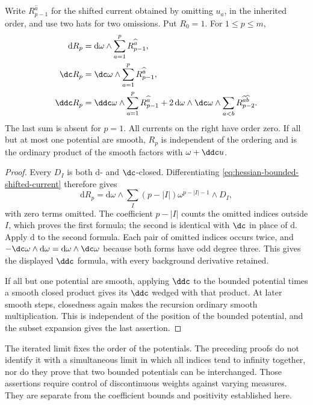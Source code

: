 \begin{proposition}\label{hessian:bounded-current-torsion}
Write $R_{p-1}^{\widehat a}$ for the shifted current obtained by
omitting $u_a$, in the inherited order, and use two hats for two
omissions. Put $R_0=1$. For $1\leq p\leq m$,
\[
 \begin{aligned}
 \mathrm dR_p&=\mathrm d\omega\wedge
                         \sum_{a=1}^pR_{p-1}^{\widehat a},\\
 \dc R_p&=\dc\omega\wedge
                         \sum_{a=1}^pR_{p-1}^{\widehat a},\\
 \ddc R_p&=\ddc\omega\wedge
                         \sum_{a=1}^pR_{p-1}^{\widehat a}
       +2\,\mathrm d\omega\wedge\dc\omega\wedge
                         \sum_{a<b}R_{p-2}^{\widehat a\widehat b}.
 \end{aligned}
\]
The last sum is absent for $p=1$. All currents on the right have order
zero. If all but at most one potential are smooth, $R_p$ is independent
of the ordering and is the ordinary
product of the smooth factors with $\omega+\ddc u$.
\end{proposition}
\begin{proof}
Every $D_I$ is both $\mathrm d$- and $\dc$-closed. Differentiating
\eqref{eq:hessian-bounded-shifted-current} therefore gives
\[
 \mathrm dR_p=\mathrm d\omega\wedge
 \sum_I(p-|I|)\omega^{p-|I|-1}\wedge D_I,
\]
with zero terms omitted. The coefficient $p-|I|$ counts the omitted
indices outside $I$, which proves the first formula; the second is
identical with $\dc$ in place of $\mathrm d$. Apply $\mathrm d$ to
the second formula. Each pair of omitted indices occurs twice, and
$-\dc\omega\wedge\mathrm d\omega
=\mathrm d\omega\wedge\dc\omega$ because both forms have odd
degree three. This gives the displayed $\ddc$ formula, with every
background derivative retained.

If all but one potential are smooth, applying $\ddc$ to the bounded
potential times a smooth closed product gives its $\ddc$ wedged
with that product. At later smooth steps, closedness again makes
the recursion ordinary smooth multiplication. This is independent
of the position of the bounded potential, and the subset expansion
gives the last assertion.
\end{proof}

The iterated limit fixes the order of the potentials. The preceding
proofs do not identify it with a simultaneous limit in which all
indices tend to infinity together, nor do they prove that two bounded
potentials can be interchanged. Those assertions require control of
discontinuous weights against varying measures. They are separate
from the coefficient bounds and positivity established here.
